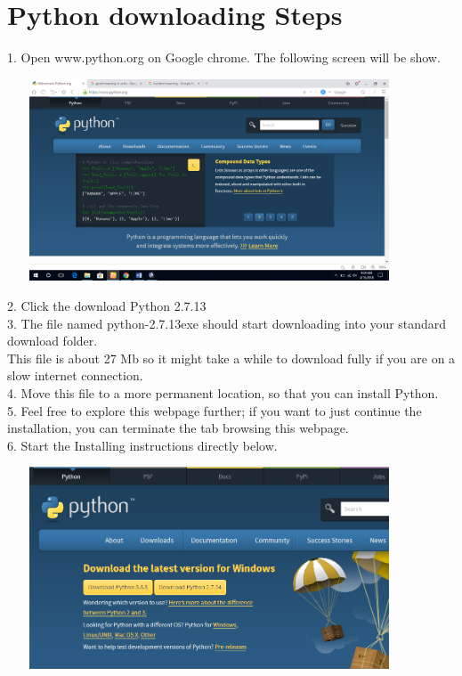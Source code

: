 \documentclass[11pt]{article}            %
\begin{document}
\section{Python downloading Steps }  
      

   
1. Open www.python.org on Google chrome. The following screen will be show.\\

\begin{center}
  \includegraphics[width=12cm,height=6cm,keepaspectratio]{9.png}\\
\end{center}

2. Click the download Python 2.7.13\\ 
3. The file named python-2.7.13exe should start downloading into your standard download folder. \\
    This file is about 27 Mb so it might take a while to download fully if you are on a slow internet connection.\\
4. Move this file to a more permanent location, so that you can install Python.\\
5. Feel free to explore this webpage further; if you want to just continue the installation, you can terminate the tab browsing this webpage.\\
6. Start the Installing instructions directly below.\\

\begin{center}
  \includegraphics[width=12cm,height=6cm,keepaspectratio]{1.png}\\
\end{center}
\end{document}
